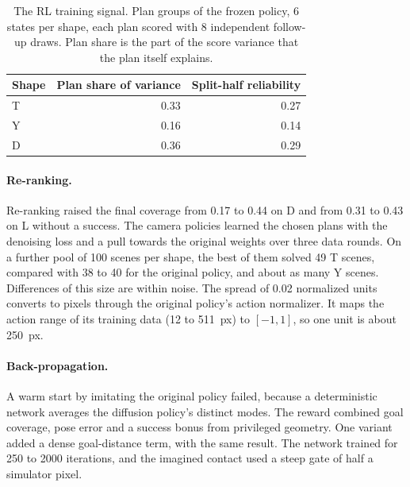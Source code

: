 \documentclass[10pt,twocolumn,letterpaper]{article}
\begin{document}
\begin{table}[!htbp]
  \centering\small
  \caption{The RL training signal. Plan groups of the frozen policy, 6 states per shape, each plan scored with 8
  independent follow-up draws. Plan share is the part of the score variance that the plan itself explains.}
  \label{tab:snr}
  \begin{tabular}{@{}lrr@{}}
    \toprule
    Shape & Plan share of variance & Split-half reliability \\
    \midrule
    T & 0.33 & 0.27 \\
    Y & 0.16 & 0.14 \\
    D & 0.36 & 0.29 \\
    \bottomrule
  \end{tabular}
\end{table}

\paragraph{Re-ranking.}
Re-ranking raised the final coverage from 0.17 to 0.44 on D and from 0.31 to 0.43 on L without a success. The camera
policies learned the chosen plans with the denoising loss and a pull towards the original weights over three data
rounds. On a further pool of 100 scenes per shape, the best of them solved 49 T scenes, compared with 38 to 40 for the
original policy, and about as many Y scenes. Differences of this size are within noise. The spread of 0.02
normalized units converts to pixels through the original policy's action normalizer. It maps the action range of its
training data (12 to 511~px) to $[-1, 1]$, so one unit is about 250~px.

\paragraph{Back-propagation.}
A warm start by imitating the original policy failed, because a deterministic network averages the diffusion policy's
distinct modes. The reward combined goal coverage, pose error and a success bonus from privileged geometry. One variant
added a dense goal-distance term, with the same result. The network trained for 250 to 2000 iterations, and the
imagined contact used a steep gate of half a simulator pixel.
\end{document}
